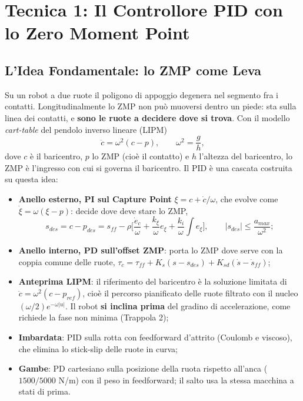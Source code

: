 \documentclass[11pt,a4paper]{article}
\begin{document}
\section{Tecnica 1: Il Controllore PID con lo Zero Moment Point}

\subsection{L'Idea Fondamentale: lo ZMP come Leva}
Su un robot a due ruote il poligono di appoggio degenera nel segmento fra i contatti. Longitudinalmente lo ZMP non può muoversi dentro un piede: sta sulla linea dei contatti, e \textbf{sono le ruote a decidere dove si trova}. Con il modello \textit{cart-table} del pendolo inverso lineare (LIPM)
\begin{equation}
\ddot{c} = \omega^2 (c - p), \qquad \omega^2 = \frac{g}{h},
\end{equation}
dove $c$ è il baricentro, $p$ lo ZMP (cioè il contatto) e $h$ l'altezza del baricentro, lo ZMP è l'ingresso con cui si governa il baricentro. Il PID è una cascata costruita su questa idea:
\begin{itemize}
    \item \textbf{Anello esterno, PI sul Capture Point} $\xi = c + \dot{c}/\omega$, che evolve come $\dot{\xi} = \omega(\xi - p)$: decide dove deve stare lo ZMP,
    \begin{equation}
    s_{des} = c - p_{des} = s_{ff} - \rho\Big[\frac{\dot{e}_c}{\omega} + \frac{k_\xi}{\omega} e_\xi + \frac{k_i}{\omega}\int e_\xi\Big], \qquad |s_{des}| \le \frac{a_{max}}{\omega^2};
    \end{equation}
    \item \textbf{Anello interno, PD sull'offset ZMP}: porta lo ZMP dove serve con la coppia comune delle ruote, $\tau_c = \tau_{ff} + K_s(s - s_{des}) + K_{sd}(\dot{s} - \dot{s}_{ff})$;
    \item \textbf{Anteprima LIPM}: il riferimento del baricentro è la soluzione limitata di $\ddot{c} = \omega^2(c - p_{ref})$, cioè il percorso pianificato delle ruote filtrato con il nucleo $(\omega/2)e^{-\omega|u|}$. Il robot \textbf{si inclina prima} del gradino di accelerazione, come richiede la fase non minima (Trappola 2);
    \item \textbf{Imbardata}: PID sulla rotta con feedforward d'attrito (Coulomb e viscoso), che elimina lo stick-slip delle ruote in curva;
    \item \textbf{Gambe}: PD cartesiano sulla posizione della ruota rispetto all'anca ($1500/5000$ N/m) con il peso in feedforward; il salto usa la stessa macchina a stati di prima.
\end{itemize}
\end{document}
